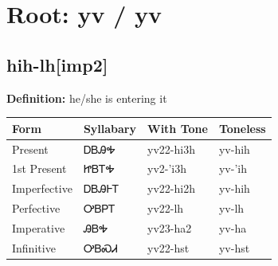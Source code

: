 \documentclass{article}%
\begin{document}
%
\normalsize%
\section*{Root: yv / yv}%
\subsection*{hih-lh[imp2]}%
\textbf{Definition: }%
he/she is entering it%
\\[0.5em]%
\begin{tabular}{|l|l|l|l|}%
\hline%
\textbf{Form}&\textbf{Syllabary}&\textbf{With Tone}&\textbf{Toneless}\\%
\hline%
Present&ᎠᏴᎯᎭ&yv22{-}hi3h&yv{-}hih\\%
1st Present&ᏥᏴᎢᎭ&yv2{-}'i3h&yv{-}'ih\\%
Imperfective&ᎠᏴᎯᎰᎢ&yv22{-}hi2h&yv{-}hih\\%
Perfective&ᎤᏴᏢᎢ&yv22{-}lh&yv{-}lh\\%
Imperative&ᎯᏴᎭ&yv23{-}ha2&yv{-}ha\\%
Infinitive&ᎤᏴᏍᏗ&yv22{-}hst&yv{-}hst\\%
\hline%
\end{tabular}%
\\[1em]%
\end{document}
